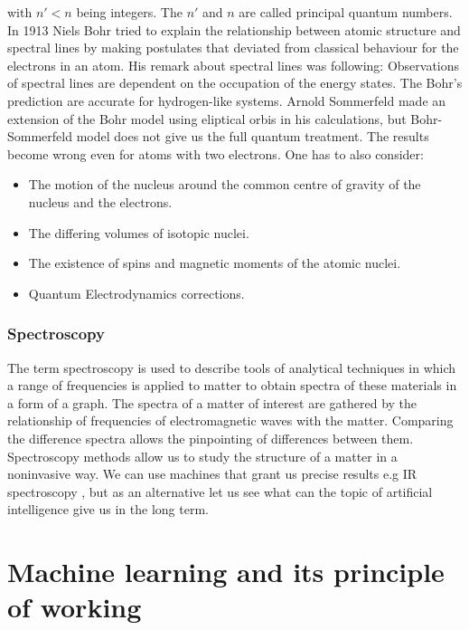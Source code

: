 \documentclass[a4paper,oneside,openright,11pt]{book}
\begin{document}
with $n' < n$ being integers. The $n'$ and $n$ are called principal quantum numbers. In 1913 Niels Bohr tried to explain the relationship between atomic structure and spectral lines by making postulates that deviated from classical behaviour for the electrons in an atom. His remark about spectral lines was following: Observations of spectral lines are dependent on the occupation of the energy states. The Bohr's prediction are accurate for hydrogen-like systems. Arnold Sommerfeld made an extension of the Bohr model using eliptical orbis in his calculations, but Bohr-Sommerfeld model does not give us the full quantum treatment. The results become wrong even for atoms with two electrons. One has to also consider:\cite{haken}

\begin{itemize}
    \item The motion of the nucleus around the common centre of gravity of the nucleus and the electrons.
    \item The differing volumes of isotopic nuclei.
    \item The existence of spins and magnetic moments of the atomic nuclei.
    \item Quantum Electrodynamics corrections.
\end{itemize}


\subsection{Spectroscopy}


The term spectroscopy is used to describe tools of analytical techniques in which a range of frequencies is applied to matter to obtain spectra of these materials in a form of a graph. The spectra of a matter of interest are gathered by the relationship of frequencies of electromagnetic waves with the matter. Comparing the difference spectra allows the pinpointing of differences between them. Spectroscopy methods allow us to study the structure of a matter in a noninvasive way. We can use machines that grant us precise results e.g IR spectroscopy \cite{maszyny}, but as an alternative let us see what can the topic of artificial intelligence give us in the long term.

\chapter{Machine learning and its principle of working}
\end{document}
